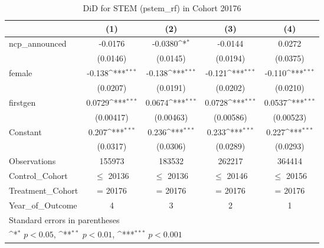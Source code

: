 \begin{table}[htbp]\centering
\def\sym#1{\ifmmode^{#1}\else\(^{#1}\)\fi}
\caption{DiD for STEM (pstem\_rf) in Cohort 20176}
\begin{tabular}{l*{4}{c}}
\toprule
                &\multicolumn{1}{c}{(1)}         &\multicolumn{1}{c}{(2)}         &\multicolumn{1}{c}{(3)}         &\multicolumn{1}{c}{(4)}         \\
\midrule
ncp\_announced   &  -0.0176         &  -0.0380\sym{*}  &  -0.0144         &   0.0272         \\
                & (0.0146)         & (0.0145)         & (0.0194)         & (0.0375)         \\
\addlinespace
female          &   -0.138\sym{***}&   -0.138\sym{***}&   -0.121\sym{***}&   -0.110\sym{***}\\
                & (0.0207)         & (0.0191)         & (0.0202)         & (0.0210)         \\
\addlinespace
firstgen        &   0.0729\sym{***}&   0.0674\sym{***}&   0.0728\sym{***}&   0.0537\sym{***}\\
                &(0.00417)         &(0.00463)         &(0.00586)         &(0.00523)         \\
\addlinespace
Constant        &    0.207\sym{***}&    0.236\sym{***}&    0.233\sym{***}&    0.227\sym{***}\\
                & (0.0317)         & (0.0306)         & (0.0289)         & (0.0293)         \\
\midrule
Observations    &   155973         &   183532         &   262217         &   364414         \\
Control\_Cohort  &$\le$ 20136         &$\le$ 20136         &$\le$ 20146         &$\le$ 20156         \\
Treatment\_Cohort&  = 20176         &  = 20176         &  = 20176         &  = 20176         \\
Year\_of\_Outcome &        4         &        3         &        2         &        1         \\
\bottomrule
\multicolumn{5}{l}{\footnotesize Standard errors in parentheses}\\
\multicolumn{5}{l}{\footnotesize \sym{*} \(p<0.05\), \sym{**} \(p<0.01\), \sym{***} \(p<0.001\)}\\
\end{tabular}
\end{table}
